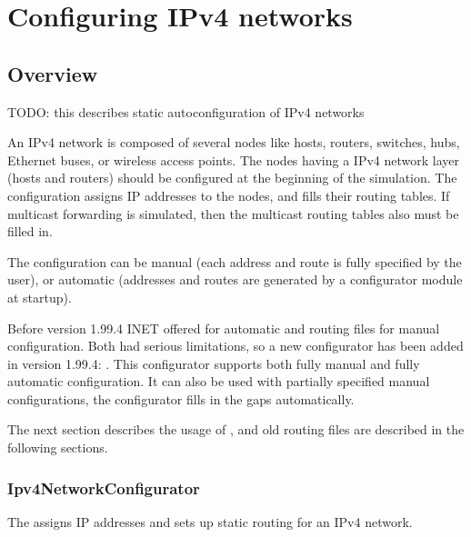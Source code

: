
\chapter{Configuring IPv4 networks}
\label{cha:ipv4-config}

\section{Overview}

TODO: this describes static autoconfiguration of IPv4 networks

An IPv4 network is composed of several nodes like hosts, routers,
switches, hubs, Ethernet buses, or wireless access points.
The nodes having a IPv4 network layer (hosts and routers) should be
configured at the beginning of the simulation. The configuration
assigns IP addresses to the nodes, and fills their routing tables.
If multicast forwarding is simulated, then the multicast routing
tables also must be filled in.


The configuration can be manual (each address and route is fully specified
by the user), or automatic (addresses and routes are generated by
a configurator module at startup).

Before version 1.99.4 INET offered 
for automatic and routing files for manual configuration.
Both had serious limitations, so a new configurator has been added
in version 1.99.4: . This configurator
supports both fully manual and fully automatic configuration. It
can also be used with partially specified manual configurations,
the configurator fills in the gaps automatically.

The next section describes the usage of ,
 and old routing files are described
in the following sections.

\subsection{Ipv4NetworkConfigurator}
\label{subsec:ipv4configurator}

The  assigns IP addresses and sets up
static routing for an IPv4 network.

